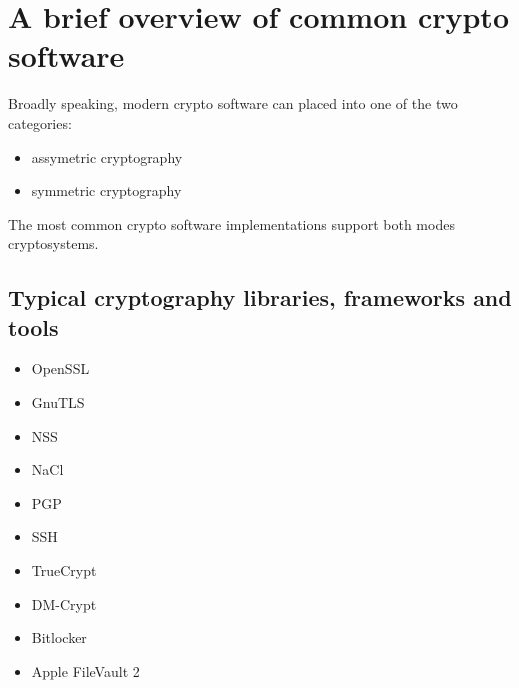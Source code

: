 \section{A brief overview of common crypto software}

Broadly speaking, modern crypto software can placed into one of the two categories:

\begin{itemize}
\item assymetric cryptography 
\item symmetric cryptography
\end{itemize}

The most common crypto software implementations support both modes cryptosystems.

\subsection{Typical cryptography libraries, frameworks and tools}

\begin{itemize}
\item OpenSSL
\item GnuTLS
\item NSS
\item NaCl
\item PGP
\item SSH
\item TrueCrypt
\item DM-Crypt
\item Bitlocker %
\item Apple FileVault 2
\end{itemize}






